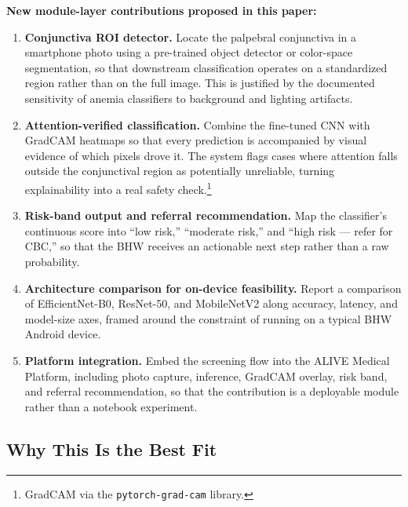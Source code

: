\documentclass[11pt]{article}
\begin{document}
    \textbf{New module-layer contributions proposed in this paper:}
    \begin{enumerate}[leftmargin=1.8em]
        \item \textbf{Conjunctiva ROI detector.} Locate the palpebral conjunctiva in a smartphone photo using a pre-trained object detector or color-space segmentation, so that downstream classification operates on a standardized region rather than on the full image. This is justified by the documented sensitivity of anemia classifiers to background and lighting artifacts.
        \item \textbf{Attention-verified classification.} Combine the fine-tuned CNN with GradCAM heatmaps so that every prediction is accompanied by visual evidence of which pixels drove it. The system flags cases where attention falls outside the conjunctival region as potentially unreliable, turning explainability into a real safety check.\footnote{GradCAM via the \texttt{pytorch-grad-cam} library.}
        \item \textbf{Risk-band output and referral recommendation.} Map the classifier's continuous score into ``low risk,'' ``moderate risk,'' and ``high risk --- refer for CBC,'' so that the BHW receives an actionable next step rather than a raw probability.
        \item \textbf{Architecture comparison for on-device feasibility.} Report a comparison of EfficientNet-B0, ResNet-50, and MobileNetV2 along accuracy, latency, and model-size axes, framed around the constraint of running on a typical BHW Android device.
        \item \textbf{Platform integration.} Embed the screening flow into the ALIVE Medical Platform, including photo capture, inference, GradCAM overlay, risk band, and referral recommendation, so that the contribution is a deployable module rather than a notebook experiment.
    \end{enumerate}

    \subsection{Why This Is the Best Fit}
\end{document}
